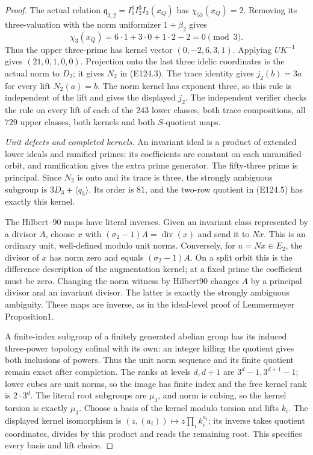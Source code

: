 \begin{proof}
The actual relation
$\mathfrak q_{3,2}=I_1^6I_2^3I_3(x_Q)$ has
$\chi_{53}(x_Q)=2$. Removing its three-valuation with
the norm uniformizer $1+\beta_2$ gives
\[
 \chi_3(x_Q)=6\cdot1+3\cdot0+1\cdot2-2=0\pmod3.
 \tag{E124.19}
\]
Thus the upper three-prime has kernel vector $(0,-2,6,3,1)$.
Applying $UK^{-1}$ gives $(21,0,1,0,0)$.
Projection onto the last three idelic coordinates is the
actual norm to $D_2$; it gives $N_2$ in (E124.3).
The trace identity gives $j_2(b)=3a$ for every lift
$N_2(a)=b$. The norm kernel has exponent three, so this
rule is independent of the lift and gives the displayed $j_2$.
The independent verifier checks the rule on every lift of
each of the $243$ lower classes, both trace compositions,
all $729$ upper classes, both kernels and both $S$-quotient maps.

\emph{Unit defects and completed kernels.}
An invariant ideal is a product of extended lower ideals and
ramified primes: its coefficients are constant on each
unramified orbit, and ramification gives the extra prime
generator. The fifty-three prime is principal. Since $N_2$
is onto and its trace is three, the strongly ambiguous subgroup
is $3D_3+\langle q_3\rangle$. Its order is $81$, and the
two-row quotient in (E124.5) has exactly this kernel.

The Hilbert--90 maps have literal inverses. Given an invariant
class represented by a divisor $A$, choose $x$ with
$(\sigma_2-1)A=\operatorname{div}(x)$ and send it to $Nx$.
This is an ordinary unit, well-defined modulo unit norms.
Conversely, for $u=Nx\in E_2$, the divisor of $x$ has norm
zero and equals $(\sigma_2-1)A$. On a split orbit this is
the difference description of the augmentation kernel; at
a fixed prime the coefficient must be zero. Changing the
norm witness by Hilbert90 changes $A$ by a principal divisor
and an invariant divisor. The latter is exactly the strongly
ambiguous ambiguity. These maps are inverse, as in the
ideal-level proof of Lemmermeyer Proposition1.

A finite-index subgroup of a finitely generated abelian group
has its induced three-power topology cofinal with its own:
an integer killing the quotient gives both inclusions of powers.
Thus the unit norm sequence and its finite quotient remain
exact after completion. The ranks at levels $d,d+1$ are
$3^d-1,3^{d+1}-1$; lower cubes are unit norms, so the image
has finite index and the free kernel rank is $2\cdot3^d$.
The literal root subgroups are $\mu_3$, and norm is cubing,
so the kernel torsion is exactly $\mu_3$.
Choose a basis of the kernel modulo torsion and lifts $k_i$.
The displayed kernel isomorphism is
$(z,(a_i))\mapsto z\prod_i k_i^{a_i}$; its inverse takes
quotient coordinates, divides by this product and reads the
remaining root. This specifies every basis and lift choice.


\end{proof}
